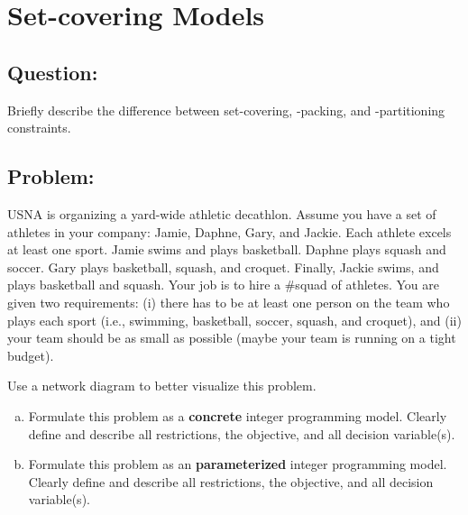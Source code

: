\documentclass[11pt]{article}
\theoremstyle{definition}
\begin{document}
\section{Set-covering Models}
\subsection{Question:} Briefly describe the difference between set-covering, -packing, and -partitioning constraints.
\pagebreak
\subsection{Problem:}
USNA is organizing a yard-wide athletic decathlon. Assume you have a set of athletes in your company: Jamie, Daphne, Gary, and Jackie. Each athlete excels at least one sport. Jamie swims and plays basketball. Daphne plays squash and soccer. Gary plays basketball, squash, and croquet. Finally, Jackie swims, and plays basketball and squash. Your job is to hire a \#squad of athletes. You are given two requirements: (i)
there has to be at least one person on the team who plays each sport (i.e., swimming, basketball, soccer, squash, and croquet), and
(ii) your team should be as small as possible (maybe your team is running on a tight budget).

Use a network diagram to better visualize this problem.
\begin{enumerate}[a.]
\item Formulate this problem as a \textbf{concrete} integer programming model. Clearly define and describe all restrictions, the objective, and all decision variable(s).
\pagebreak

\item Formulate this problem as an \textbf{parameterized} integer programming model. Clearly define and describe all restrictions, the objective, and all decision variable(s).
\end{enumerate}
\end{document}

